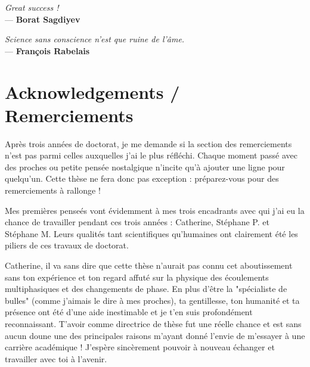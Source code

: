 

\begin{flushleft}{\slshape    
Great success !} \\ \medskip
--- \textbf{Borat Sagdiyev}
\end{flushleft}
\begin{flushright}{\slshape    
Science sans conscience n'est que ruine de l'âme.} \\ \medskip
--- \textbf{Fran\c{c}ois Rabelais}
\end{flushright}

\npar




\bigskip


\begingroup

\let\clearpage\relax
\let\cleardoublepage\relax
\let\cleardoublepage\relax

\chapter*{Acknowledgements / Remerciements}

Après trois années de doctorat, je me demande si la section des remerciements n'est pas parmi celles auxquelles j'ai le plus réfléchi. Chaque moment passé avec des proches ou petite pensée nostalgique n'incite qu'à ajouter une ligne pour quelqu'un. Cette thèse ne fera donc pas exception : préparez-vous pour des remerciements à rallonge ! 

\npar

Mes premières penseés vont évidemment à mes trois encadrants avec qui j'ai eu la chance de travailler pendant ces trois années : Catherine, Stéphane P. et Stéphane M. Leurs qualités tant scientifiques qu'humaines ont clairement été les piliers de ces travaux de doctorat.

\npar
Catherine, il va sans dire que cette thèse n'aurait pas connu cet aboutissement sans ton expérience et ton regard affuté sur la physique des écoulements multiphasiques et des changements de phase. En plus d'être la "spécialiste de bulles" (comme j'aimais le dire à mes proches), ta gentillesse, ton humanité et ta présence ont été d'une aide inestimable et je t'en suis profondément reconnaissant. T'avoir comme directrice de thèse fut une réelle chance et est sans aucun doune une des principales raisons m'ayant donné l'envie de m'essayer à une carrière académique ! J'espère sincèrement pouvoir à nouveau échanger et travailler avec toi à l'avenir.

